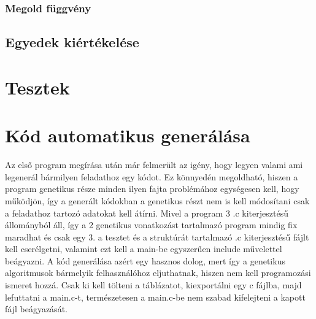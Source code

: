 \documentclass[12ppt,a4paper,oneside]{report}
\begin{document}
        \subsection{Megold függvény} %

    \section{Egyedek kiértékelése} %

\chapter{Tesztek} %

\chapter{Kód automatikus generálása} %
    {Az első program megírása után már felmerült az igény, hogy legyen valami ami legenerál bármilyen feladathoz egy kódot. Ez könnyedén megoldható, hiszen a program genetikus része minden ilyen fajta problémához egységesen kell, hogy működjön, így a generált kódokban a genetikus részt nem is kell módosítani csak a feladathoz tartozó adatokat kell átírni. Mivel a program 3 .c kiterjesztésű állományból áll, így a 2 genetikus vonatkozást tartalmazó program mindig fix maradhat és csak egy 3. a tesztet és a struktúrát tartalmazó .c kiterjesztésű fájlt kell cserélgetni, valamint ezt kell a main-be egyszerűen include művelettel beágyazni. A kód generálása azért egy hasznos dolog, mert így a genetikus algoritmusok bármelyik felhasználóhoz eljuthatnak, hiszen nem kell programozási ismeret hozzá. Csak ki kell tölteni a táblázatot, kiexportálni egy c fájlba, majd lefuttatni a main.c-t, természetesen a main.c-be nem szabad kifelejteni a kapott fájl beágyazását.}
    
    
\end{document}
